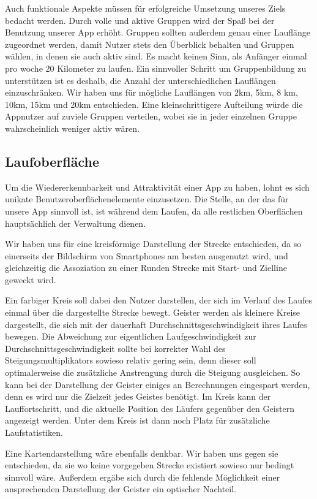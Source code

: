 Auch funktionale Aspekte müssen für erfolgreiche Umsetzung unseres Ziels bedacht werden. Durch volle und aktive Gruppen wird der Spaß bei der Benutzung unserer App erhöht. Gruppen sollten außerdem genau einer Lauflänge zugeordnet werden, damit Nutzer stets den Überblick behalten und Gruppen wählen, in denen sie auch aktiv sind. Es macht keinen Sinn, als Anfänger einmal pro woche 20 Kilometer zu laufen. Ein sinnvoller Schritt um Gruppenbildung zu unterstützen ist es deshalb, die Anzahl der unterschiedlichen Lauflängen einzuschränken. Wir haben uns für mögliche Lauflängen von 2km, 5km, 8 km, 10km, 15km und 20km entschieden. Eine kleinschrittigere Aufteilung würde die Appnutzer auf zuviele Gruppen verteilen, wobei sie in jeder einzelnen Gruppe wahrscheinlich weniger aktiv wären.
\subsection{Laufoberfläche}
Um die Wiedererkennbarkeit und Attraktivität einer App zu haben, lohnt es sich unikate Benutzeroberflächenelemente einzusetzen. Die Stelle, an der das für unsere App sinnvoll ist, ist während dem Laufen, da alle restlichen Oberflächen hauptsächlich der Verwaltung dienen.

Wir haben uns für eine kreisförmige Darstellung der Strecke entschieden, da so einerseits der Bildschirm von Smartphones am besten ausgenutzt wird, und gleichzeitig die Assoziation zu einer Runden Strecke mit Start- und Zielline geweckt wird.

Ein farbiger Kreis soll dabei den Nutzer darstellen, der sich im Verlauf des Laufes einmal über die dargestellte Strecke bewegt. Geister werden als kleinere Kreise dargestellt, die sich mit der dauerhaft Durchschnittsgeschwindigkeit ihres Laufes bewegen. Die Abweichung zur eigentlichen Laufgeschwindigkeit zur Durchschnittsgeschwindigkeit sollte bei korrekter Wahl des Steigungsmultiplikators sowieso relativ gering sein, denn dieser soll optimalerweise die zusätzliche Anstrengung durch die Steigung ausgleichen. So kann bei der Darstellung der Geister einiges an Berechnungen eingespart werden, denn es wird nur die Zielzeit jedes Geistes benötigt.
Im Kreis kann der Lauffortschritt, und die aktuelle Position des Läufers gegenüber den Geistern angezeigt werden. Unter dem Kreis ist dann noch Platz für zusätzliche Laufstatistiken. 

Eine Kartendarstellung wäre ebenfalls denkbar. Wir haben uns gegen sie entschieden, da sie wo keine vorgegeben Strecke existiert sowieso nur bedingt sinnvoll wäre. Außerdem ergäbe sich durch die fehlende Möglichkeit einer ansprechenden Darstellung der Geister ein optischer Nachteil.
